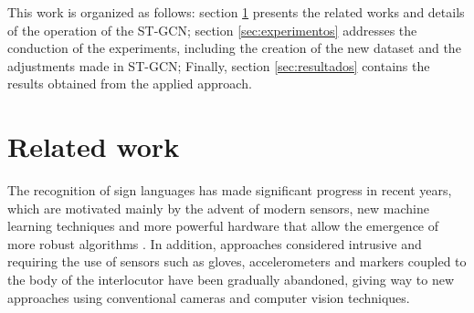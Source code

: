 This work is organized as follows: section  \ref{sec:trabalhos-relacionados} presents the related works and details of the operation of the ST-GCN; section \ref{sec:experimentos} addresses the conduction of the experiments, including the creation of the new dataset and the adjustments made in ST-GCN; Finally, section \ref{sec:resultados} contains the results obtained from the applied approach.




\section{Related work} %
\label{sec:trabalhos-relacionados}

The recognition of sign languages has made significant progress in recent years, which are motivated mainly by the advent of modern sensors, new machine learning techniques and more powerful hardware that allow the emergence of more robust algorithms \cite{recent-advances-dl-2017, recent-advances-sl-2013}. In addition, approaches considered intrusive and requiring the use of sensors such as gloves, accelerometers and markers coupled to the body of the interlocutor have been gradually abandoned, giving way to new approaches using conventional cameras and computer vision techniques.


